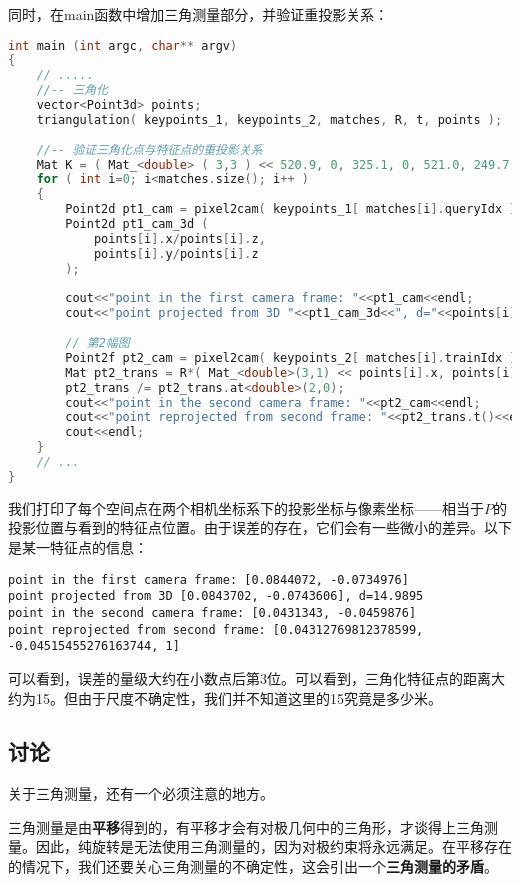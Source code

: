 同时，在main函数中增加三角测量部分，并验证重投影关系：
\begin{lstlisting}[language=c++]
int main (int argc, char** argv)
{
	// .....
    //-- 三角化
    vector<Point3d> points;
    triangulation( keypoints_1, keypoints_2, matches, R, t, points );
    
    //-- 验证三角化点与特征点的重投影关系
    Mat K = ( Mat_<double> ( 3,3 ) << 520.9, 0, 325.1, 0, 521.0, 249.7, 0, 0, 1 );
    for ( int i=0; i<matches.size(); i++ )
    {
	    Point2d pt1_cam = pixel2cam( keypoints_1[ matches[i].queryIdx ].pt, K );
	    Point2d pt1_cam_3d (
		    points[i].x/points[i].z, 
		    points[i].y/points[i].z 
	    );
    
	    cout<<"point in the first camera frame: "<<pt1_cam<<endl;
	    cout<<"point projected from 3D "<<pt1_cam_3d<<", d="<<points[i].z<<endl;
    
	    // 第2幅图
	    Point2f pt2_cam = pixel2cam( keypoints_2[ matches[i].trainIdx ].pt, K );
	    Mat pt2_trans = R*( Mat_<double>(3,1) << points[i].x, points[i].y, points[i].z ) + t;
	    pt2_trans /= pt2_trans.at<double>(2,0);
	    cout<<"point in the second camera frame: "<<pt2_cam<<endl;
	    cout<<"point reprojected from second frame: "<<pt2_trans.t()<<endl;
	    cout<<endl;
    }
    // ...
}
\end{lstlisting}

我们打印了每个空间点在两个相机坐标系下的投影坐标与像素坐标——相当于$P$的投影位置与看到的特征点位置。由于误差的存在，它们会有一些微小的差异。以下是某一特征点的信息：

\begin{lstlisting}
point in the first camera frame: [0.0844072, -0.0734976]
point projected from 3D [0.0843702, -0.0743606], d=14.9895
point in the second camera frame: [0.0431343, -0.0459876]
point reprojected from second frame: [0.04312769812378599, -0.04515455276163744, 1]
\end{lstlisting}

可以看到，误差的量级大约在小数点后第3位。可以看到，三角化特征点的距离大约为15。但由于尺度不确定性，我们并不知道这里的15究竟是多少米。

\subsection{讨论}
关于三角测量，还有一个必须注意的地方。

三角测量是由\textbf{平移}得到的，有平移才会有对极几何中的三角形，才谈得上三角测量。因此，纯旋转是无法使用三角测量的，因为对极约束将永远满足。在平移存在的情况下，我们还要关心三角测量的不确定性，这会引出一个\textbf{三角测量的矛盾}。

